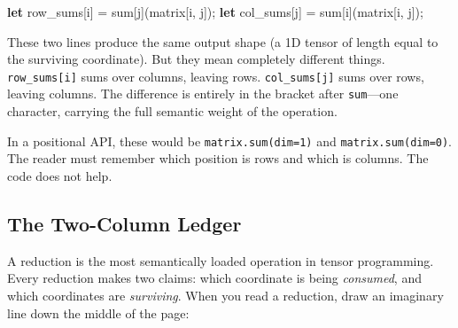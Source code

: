 \documentclass[11pt,titlepage]{article}
\newenvironment{Shaded}{}{}
\newcommand{\KeywordTok}[1]{\textcolor[rgb]{0.00,0.44,0.13}{\textbf{#1}}}
\newcommand{\NormalTok}[1]{#1}
\newcommand{\OperatorTok}[1]{\textcolor[rgb]{0.40,0.40,0.40}{#1}}
\begin{document}
\begin{Shaded}
\begin{Highlighting}[]
\KeywordTok{let}\NormalTok{ row_sums}\OperatorTok{[}\NormalTok{i}\OperatorTok{]}\NormalTok{ = sum}\OperatorTok{[}\NormalTok{j}\OperatorTok{]}\NormalTok{(matrix}\OperatorTok{[}\NormalTok{i, j}\OperatorTok{]}\NormalTok{);}
\KeywordTok{let}\NormalTok{ col_sums}\OperatorTok{[}\NormalTok{j}\OperatorTok{]}\NormalTok{ = sum}\OperatorTok{[}\NormalTok{i}\OperatorTok{]}\NormalTok{(matrix}\OperatorTok{[}\NormalTok{i, j}\OperatorTok{]}\NormalTok{);}
\end{Highlighting}
\end{Shaded}

These two lines produce the same output shape (a 1D tensor of length
equal to the surviving coordinate). But they mean completely different
things. \texttt{row\_sums{[}i{]}} sums over columns, leaving rows.
\texttt{col\_sums{[}j{]}} sums over rows, leaving columns. The
difference is entirely in the bracket after \texttt{sum}---one
character, carrying the full semantic weight of the operation.

In a positional API, these would be \texttt{matrix.sum(dim=1)} and
\texttt{matrix.sum(dim=0)}. The reader must remember which position is
rows and which is columns. The code does not help.

\vspace{2em}

\hypertarget{the-two-column-ledger}{%
\subsection{The Two-Column Ledger}\label{the-two-column-ledger}}

A reduction is the most semantically loaded operation in tensor
programming. Every reduction makes two claims: which coordinate is being
\emph{consumed}, and which coordinates are \emph{surviving}. When you
read a reduction, draw an imaginary line down the middle of the page:
\end{document}
